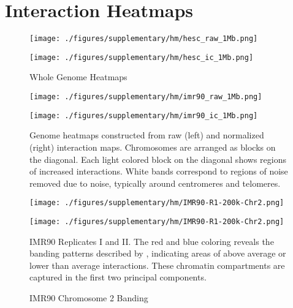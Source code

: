 \newpage
\section*{Interaction Heatmaps}

\begin{figure}[H]
  \caption{Whole Genome Heatmaps}\label{fig:WholeGenomeHeatmaps}
  \begin{minipage}{0.5\textwidth}%
    \texttt{[image: ./figures/supplementary/hm/hesc\_raw\_1Mb.png]}
  \end{minipage}%
  \hfill
  \begin{minipage}{0.5\textwidth}
    \texttt{[image: ./figures/supplementary/hm/hesc\_ic\_1Mb.png]}
  \end{minipage}
\end{figure}

\begin{figure}[H]
  \begin{minipage}{0.5\textwidth}%
    \texttt{[image: ./figures/supplementary/hm/imr90\_raw\_1Mb.png]}
  \end{minipage}%
  \hfill
  \begin{minipage}{0.5\textwidth}
    \texttt{[image: ./figures/supplementary/hm/imr90\_ic\_1Mb.png]}
  \end{minipage}
  \small
  Genome heatmaps constructed from raw (left) and normalized (right) interaction maps.
  Chromosomes are arranged as blocks on the diagonal.  Each light colored block on the
  diagonal shows regions of increased interactions.  White bands correspond to regions
  of noise removed due to noise, typically around centromeres and telomeres.
\end{figure}

\begin{figure}[H]
  \caption{IMR90 Chromosome 2 Banding}\label{fig:Chrom2Banding}
  \begin{minipage}{0.5\textwidth}%
    \texttt{[image: ./figures/supplementary/hm/IMR90-R1-200k-Chr2.png]}
  \end{minipage}%
  \hfill
  \begin{minipage}{0.5\textwidth}
    \texttt{[image: ./figures/supplementary/hm/IMR90-R1-200k-Chr2.png]}
  \end{minipage}
  \small
  IMR90 Replicates I and II\@.  The red and blue coloring reveals the banding patterns described by
  \citet{dekker2012}, indicating areas of above average or lower than average interactions.  These chromatin
  compartments are captured in the first two principal components.
\end{figure}


